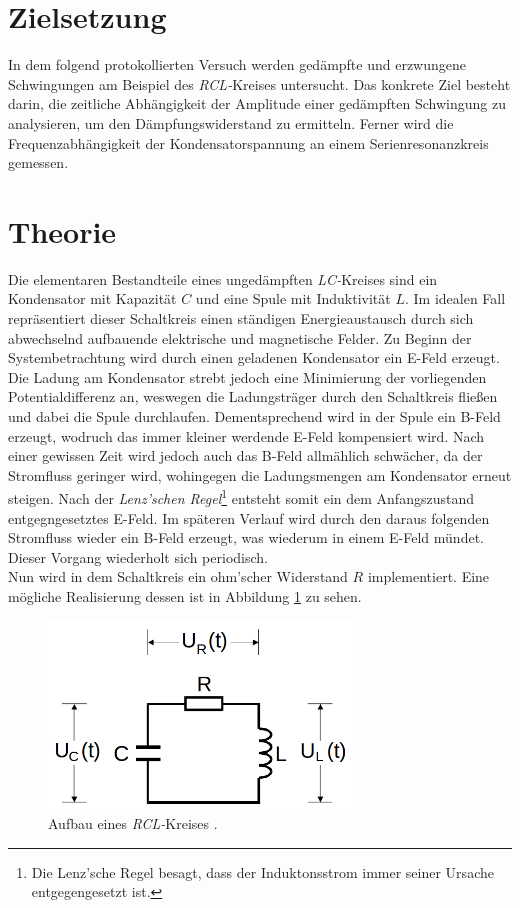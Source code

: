 


\section{Zielsetzung}

In dem folgend protokollierten Versuch werden gedämpfte und erzwungene Schwingungen am Beispiel des \emph{RCL-}Kreises
untersucht. Das konkrete Ziel besteht darin, die zeitliche Abhängigkeit der Amplitude einer gedämpften Schwingung zu
analysieren, um den Dämpfungswiderstand zu ermitteln. Ferner wird die Frequenzabhängigkeit der Kondensatorspannung an einem
Serienresonanzkreis gemessen.

\section{Theorie}
\label{sec:Theorie}

Die elementaren Bestandteile eines ungedämpften \emph{LC-}Kreises sind ein Kondensator mit Kapazität $C$ und eine 
Spule mit Induktivität $L$. Im idealen Fall repräsentiert dieser Schaltkreis einen ständigen Energieaustausch durch 
sich abwechselnd aufbauende elektrische und magnetische Felder. Zu Beginn der Systembetrachtung wird durch einen 
geladenen Kondensator ein E-Feld erzeugt. Die Ladung am Kondensator strebt jedoch eine Minimierung der vorliegenden 
Potentialdifferenz an, weswegen die Ladungsträger durch den Schaltkreis fließen und dabei die Spule durchlaufen. 
Dementsprechend wird in der Spule ein B-Feld erzeugt, wodruch das immer kleiner werdende E-Feld kompensiert wird. Nach
einer gewissen Zeit wird jedoch auch das B-Feld allmählich schwächer, da der Stromfluss geringer wird, wohingegen die 
Ladungsmengen am Kondensator erneut steigen. Nach der \emph{Lenz'schen Regel}\footnote{Die Lenz'sche Regel besagt, dass der
Induktonsstrom immer seiner Ursache entgegengesetzt ist.} entsteht somit ein dem Anfangszustand entgegngesetztes E-Feld.
Im späteren Verlauf wird durch den daraus folgenden Stromfluss wieder ein B-Feld erzeugt, was wiederum in einem E-Feld 
mündet. Dieser Vorgang wiederholt sich periodisch.\\
Nun wird in dem Schaltkreis ein ohm'scher Widerstand $R$ implementiert. Eine mögliche Realisierung dessen ist in Abbildung 
\ref{fig:RCL-Kreis} zu sehen.

\begin{figure}
    \centering
    \includegraphics[height=5cm]{RCL_Kreis.png}
    \caption{Aufbau eines \emph{RCL-}Kreises \cite{Versuchsanleitung_v354}.}
    \label{fig:RCL-Kreis}
\end{figure}

